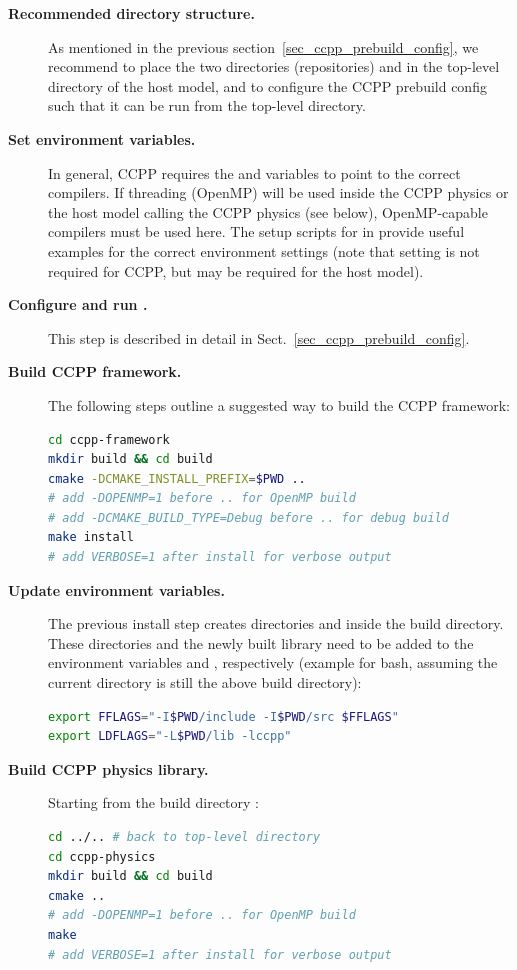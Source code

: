 \begin{description}
\item[\textbf{Recommended directory structure.}] As mentioned in the previous section~\ref{sec_ccpp_prebuild_config}, we recommend to place the two directories (repositories)  and  in the top-level directory of the host model, and to configure the CCPP prebuild config such that it can be run from the top-level directory.
\item[\textbf{Set environment variables.}] In general, CCPP requires the  and  variables to point to the correct compilers. If threading (OpenMP) will be used inside the CCPP physics or the host model calling the CCPP physics (see below), OpenMP-capable compilers must be used here. The setup scripts for  in  provide useful examples for the correct environment settings (note that setting  is not required for CCPP, but may be required for the host model).
\item[\textbf{Configure and run .}] This step is described in detail in Sect.~\ref{sec_ccpp_prebuild_config}.
\item[\textbf{Build CCPP framework.}] The following steps outline a suggested way to build the CCPP framework:
\begin{lstlisting}[language=bash]
cd ccpp-framework
mkdir build && cd build
cmake -DCMAKE_INSTALL_PREFIX=$PWD ..
# add -DOPENMP=1 before .. for OpenMP build
# add -DCMAKE_BUILD_TYPE=Debug before .. for debug build
make install
# add VERBOSE=1 after install for verbose output
\end{lstlisting}
\item[\textbf{Update environment variables.}] The previous install step creates directories  and  inside the build directory. These directories and the newly built library  need to be added to the environment variables  and , respectively (example for bash, assuming the current directory is still the above build directory):
\begin{lstlisting}[language=bash]
export FFLAGS="-I$PWD/include -I$PWD/src $FFLAGS"
export LDFLAGS="-L$PWD/lib -lccpp"
\end{lstlisting}
\item[\textbf{Build CCPP physics library.}] Starting from the build directory :
\begin{lstlisting}[language=bash]
cd ../.. # back to top-level directory
cd ccpp-physics
mkdir build && cd build
cmake ..
# add -DOPENMP=1 before .. for OpenMP build
make
# add VERBOSE=1 after install for verbose output
\end{lstlisting}
\end{description}
